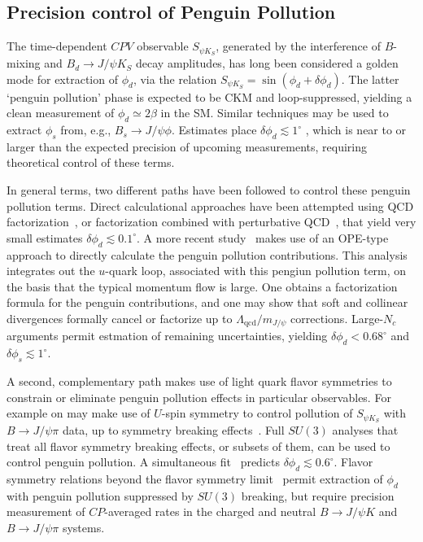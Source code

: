 \subsection{Precision control of Penguin Pollution}
The time-dependent $CPV$ observable $S_{\psi K_S}$, generated by the interference of $B$-mixing and $B_d \to J/\psi K_S$ decay amplitudes, has long been considered a golden mode for extraction of $\phi_d$, via the relation $S_{\psi K_S} = \sin (\phi_d + \delta \phi_d)$. The latter `penguin pollution' phase is expected to be CKM and loop-suppressed, yielding a clean measurement of $\phi_d \simeq 2 \beta$ in the SM. Similar techniques may be used to extract $\phi_s$ from, e.g., $B_s \to J/\psi \phi$. Estimates place $\delta \phi_d \lesssim 1^\circ$ \cite{Boos:2004xp,Ciuchini:2005mg,Li:2006vq,Faller:2008zc,Ciuchini:2011kd,Jung:2012mp,DeBruyn:2014oga,Frings:2015eva,Ligeti:2015yma}, which is near to or larger than the expected precision of upcoming measurements, requiring theoretical control of these terms.

In general terms, two different paths have been followed to control these penguin pollution terms. Direct calculational approaches have been attempted using QCD factorization~\cite{Boos:2004xp}, or factorization combined with perturbative QCD~\cite{Li:2006vq}, that yield very small estimates $\delta \phi_d \lesssim 0.1^\circ$. A more recent study~\cite{Frings:2015eva} makes use of an OPE-type approach to directly calculate the penguin pollution contributions. This analysis integrates out the $u$-quark loop, associated with this pengiun pollution term, on the basis that the typical momentum flow is large. One obtains a factorization formula for the penguin contributions, and one may show that soft and collinear divergences formally cancel or factorize up to $\Lambda_{\text{qcd}}/m_{J/\psi}$ corrections. Large-$N_c$ arguments permit estmation of remaining uncertainties, yielding $\delta \phi_d < 0.68^\circ$ and $\delta \phi_s \lesssim 1^\circ$. 

A second, complementary path makes use of light quark flavor symmetries to constrain or eliminate penguin pollution effects in particular observables. For example on may make use of $U$-spin symmetry to  control pollution of $S_{\psi K_S}$ with $B \to J/\psi \pi$ data, up to symmetry breaking effects~\cite{Ciuchini:2005mg,Faller:2008zc,Ciuchini:2011kd,DeBruyn:2014oga}. Full $SU(3)$ analyses \cite{Jung:2012mp,DeBruyn:2014oga, Ligeti:2015yma} that treat all flavor symmetry breaking effects, or subsets of them, can be used to control penguin pollution. A simultaneous fit~\cite{Jung:2012mp} predicts $\delta \phi_d \lesssim 0.6^\circ$.  Flavor symmetry relations beyond the flavor symmetry limit~\cite{Ligeti:2015yma} permit extraction of $\phi_d$ with penguin pollution suppressed by $SU(3)$ breaking, but require precision measurement of $CP$-averaged rates in the charged and neutral $B \to J/\psi K$ and $B \to J/\psi \pi$ systems.

